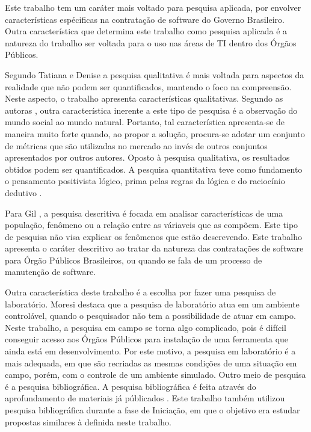 Este trabalho tem um caráter mais voltado para  pesquisa aplicada, por envolver características espécificas na contratação de software do Governo Brasileiro. Outra característica que determina este trabalho como pesquisa aplicada é a natureza do trabalho ser voltada para o uso nas áreas de TI dentro dos Órgãos Públicos.

Segundo Tatiana e Denise \cite{tatiana_denise} a pesquisa qualitativa é mais voltada para aspectos da realidade que não podem ser quantificados, mantendo o foco na compreensão. Neste aspecto, o trabalho apresenta características qualitativas. Segundo as autoras \cite{tatiana_denise}, outra característica inerente a este tipo de pesquisa é a observação do mundo social ao mundo natural. Portanto, tal característica apresenta-se de maneira muito forte quando, ao propor a solução, procura-se adotar um conjunto de métricas que são utilizadas no mercado ao invés de outros conjuntos apresentados por outros autores. Oposto à pesquisa qualitativa, os resultados obtidos podem ser quantificados. A pesquisa quantitativa teve como fundamento o pensamento positivista lógico, prima pelas regras da lógica e do raciocínio dedutivo \cite{tatiana_denise}. 

Para Gil \cite{gil_como_2002}, a pesquisa descritiva é focada em analisar características de uma população, fenômeno ou a relação entre as váriaveis que as compõem. Este tipo de pesquisa não visa explicar os fenômenos que estão descrevendo\cite{moresi_metodologia_2003}. Este trabalho apresenta o caráter descritivo ao tratar da natureza das contratações de software para Órgão Públicos Brasileiros, ou quando se fala de um processo de manutenção de software.

Outra característica deste trabalho é a escolha por fazer uma pesquisa de laboratório. Moresi destaca que a pesquisa de laboratório atua em um ambiente controlável, quando o pesquisador não tem a possibilidade de atuar em campo. Neste trabalho, a pesquisa em campo se torna algo complicado, pois é difícil conseguir acesso aos Órgãos Públicos para instalação de uma ferramenta que ainda está em desenvolvimento. Por este motivo, a pesquisa em laboratório é a mais adequada, em que são recriadas as mesmas condições de uma situação em campo, porém, com o controle de um ambiente simulado. Outro meio de pesquisa é a pesquisa bibliográfica. A pesquisa bibliográfica é feita através do aprofundamento de materiais já públicados \cite{tatiana_denise}. Este trabalho também utilizou pesquisa bibliográfica durante a fase de Iniciação, em que o objetivo era estudar propostas similares à definida neste trabalho.

